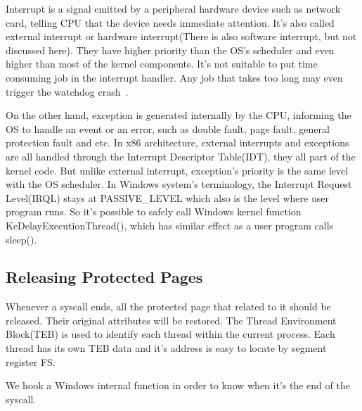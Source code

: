 Interrupt is a signal emitted by a peripheral hardware device such as network card, telling CPU that the device needs immediate attention. It's also called external interrupt or hardware interrupt(There is also software interrupt, but not discussed here). They have higher priority than the OS's scheduler and even higher than most of the kernel components. It's not suitable to put time consuming job in the interrupt handler. Any job that takes too long may even trigger the watchdog crash~\cite{msdnwatchdog}.   

On the other hand, exception is generated internally by the CPU, informing the OS to handle an event or an error, such as double fault, page fault, general protection fault and etc. In x86 architecture, external interrupts and exceptions are all handled through the Interrupt Descriptor Table(IDT), they all part of the kernel code. But unlike external interrupt, exception's priority is the same level with the OS scheduler. In Windows system's terminology, the Interrupt Request Level(IRQL) stays at PASSIVE\_LEVEL which also is the level where user program runs. So it's possible to safely call Windows kernel function KeDelayExecutionThread(), which has similar effect as a user program calls sleep(). 


\subsection{Releasing Protected Pages}


Whenever a syscall ends, all the protected page that related to it should be released. Their original attributes will be restored. The Thread Environment Block(TEB) is used to identify each thread within the current process. Each thread has its own TEB data and it's address is easy to locate by segment register FS. 

We hook a Windows internal function in order to know when it's the end of the syscall. 

